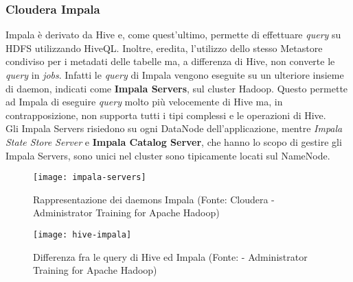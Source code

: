 \subsubsection{Cloudera Impala}
Impala è derivato da Hive e, come quest'ultimo, permette di effettuare \textit{query} su HDFS utilizzando HiveQL. Inoltre, eredita, l'utilizzo dello stesso Metastore condiviso per i metadati delle tabelle ma, a differenza di Hive, non converte le \textit{query} in \textit{jobs}. Infatti le \textit{query} di Impala vengono eseguite su un ulteriore insieme di \gls{daemon}, indicati come \textbf{Impala Servers}, sul \gls{cluster} Hadoop. Questo permette ad Impala di eseguire \textit{query} molto più velocemente di Hive ma, in contrapposizione, non supporta tutti i tipi complessi e le operazioni di Hive.\\
Gli Impala Servers risiedono su ogni DataNode dell'applicazione, mentre \textit{Impala State Store Server} e \textbf{Impala Catalog Server}, che hanno lo scopo di gestire gli Impala Servers, sono unici nel \gls{cluster} sono tipicamente locati sul NameNode. 
\begin{figure}[!h]
	\centering
	\texttt{[image: impala-servers]}
	\caption{Rappresentazione dei daemons Impala (Fonte: Cloudera - Administrator Training for Apache Hadoop)}
\end{figure}

\begin{figure}[!h]
	\centering
	\texttt{[image: hive-impala]}
	\caption{Differenza fra le query di Hive ed Impala (Fonte: - Administrator Training for Apache Hadoop)}
\end{figure}


